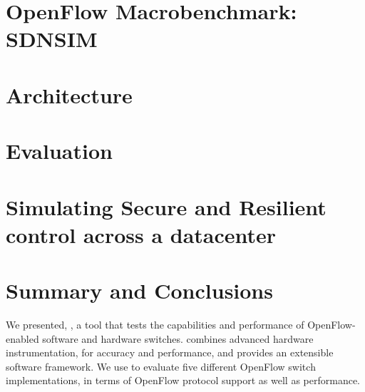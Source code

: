 

\section{OpenFlow Macrobenchmark: SDNSIM}

\section{Architecture}

\section{Evaluation}

\section{Simulating Secure and Resilient  control across a datacenter}

\section{Summary and Conclusions}\label{sec:conclusion}
  
We presented, \oflops, a tool that tests the capabilities and performance of 
OpenFlow-enabled software and hardware switches. \oflops combines advanced 
hardware instrumentation, for accuracy and performance, and provides an extensible 
software framework. We use \oflops to evaluate five different OpenFlow switch 
implementations, in terms of OpenFlow protocol support as well as performance.

